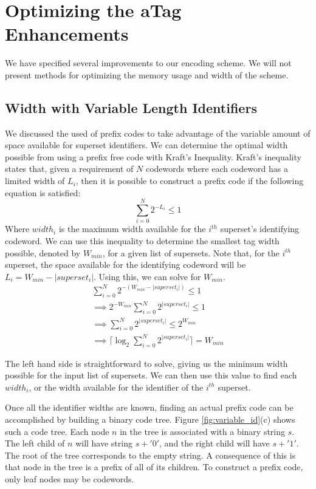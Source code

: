 \section{Optimizing the aTag Enhancements}
We have specified several improvements to our encoding scheme. We will not present methods for optimizing the memory usage and width of the scheme.

\subsection{Width with Variable Length Identifiers}
We discussed the used of prefix codes to take advantage of the variable amount of space available for superset identifiers. We can determine the optimal width possible from using a prefix free code with Kraft's Inequality. Kraft's inequality states that, given a requirement of $N$ codewords where each codeword has a limited width of $L_i$, then it is possible to construct a prefix code if the following equation is satisfied:
$$ \sum_{i = 0}^{N}{2^{-L_i} \le 1} $$
Where $width_i$ is the maximum width available for the $i^{th}$ superset's identifying codeword. We can use this inequality to determine the smallest tag width possible, denoted by $W_{min}$, for a given list of supersets. Note that, for the $i^{th}$ superset, the space available for the identifying codeword will be $L_i = W_{min} - |superset_i|$. Using this, we can solve for $W_{min}$.\\

\begin{equation} \label{eq1}
 \begin{split}
  \sum_{i = 0}^{N}{2^{-(W_{min} - |superset_i|)}}   \le  1 \\
  \implies 2^{-W_{min}} \sum_{i = 0}^{N}{2^{|superset_i|}}   \le  1 \\
  \implies  \sum_{i = 0}^{N}{2^{|superset_i|}}   \le  2^{W_{min}} \\
 \implies   \lceil\log_2{\sum_{i = 0}^{N}{2^{|superset_i|}}}\rceil  =  W_{min}
\end{split}
 \end{equation}
 
 The left hand side is straightforward to solve, giving us the minimum width possible for the input list of supersets. We can then use this value to find each $width_i$, or the width available for the identifier of the $i^{th}$ superset.
 
 Once all the identifier widths are known, finding an actual prefix code can be accomplished by building a binary code tree. Figure \ref{fig:variable_id}(c) shows such a code tree. Each node $n$ in the tree is associated with a binary string $s$. The left child of $n$ will have string $s + '0'$, and the right child will have $s + '1'$. The root of the tree corresponds to the empty string. A consequence of this is that node in the tree is a prefix of all of its children. To construct a prefix code, only leaf nodes may be codewords. 
 
